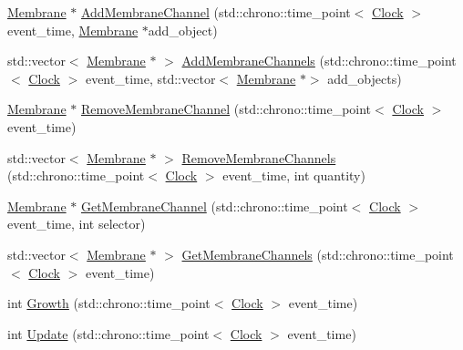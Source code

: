 \begin{DoxyCompactItemize}
\item 
\mbox{\hyperlink{classMembrane}{Membrane}} $\ast$ \mbox{\hyperlink{classMembrane_a3e3b4f55f028541e7513f826d01a689a}{Add\+Membrane\+Channel}} (std\+::chrono\+::time\+\_\+point$<$ \mbox{\hyperlink{universe_8h_a0ef8d951d1ca5ab3cfaf7ab4c7a6fd80}{Clock}} $>$ event\+\_\+time, \mbox{\hyperlink{classMembrane}{Membrane}} $\ast$add\+\_\+object)
\item 
std\+::vector$<$ \mbox{\hyperlink{classMembrane}{Membrane}} $\ast$ $>$ \mbox{\hyperlink{classMembrane_aab591875e3266d6c5af0f7c5f7f21e8f}{Add\+Membrane\+Channels}} (std\+::chrono\+::time\+\_\+point$<$ \mbox{\hyperlink{universe_8h_a0ef8d951d1ca5ab3cfaf7ab4c7a6fd80}{Clock}} $>$ event\+\_\+time, std\+::vector$<$ \mbox{\hyperlink{classMembrane}{Membrane}} $\ast$$>$ add\+\_\+objects)
\item 
\mbox{\hyperlink{classMembrane}{Membrane}} $\ast$ \mbox{\hyperlink{classMembrane_a36d6927c8869cc752b55623dac661107}{Remove\+Membrane\+Channel}} (std\+::chrono\+::time\+\_\+point$<$ \mbox{\hyperlink{universe_8h_a0ef8d951d1ca5ab3cfaf7ab4c7a6fd80}{Clock}} $>$ event\+\_\+time)
\item 
std\+::vector$<$ \mbox{\hyperlink{classMembrane}{Membrane}} $\ast$ $>$ \mbox{\hyperlink{classMembrane_ac33ffd86416112420dc5b0576287c44d}{Remove\+Membrane\+Channels}} (std\+::chrono\+::time\+\_\+point$<$ \mbox{\hyperlink{universe_8h_a0ef8d951d1ca5ab3cfaf7ab4c7a6fd80}{Clock}} $>$ event\+\_\+time, int quantity)
\item 
\mbox{\hyperlink{classMembrane}{Membrane}} $\ast$ \mbox{\hyperlink{classMembrane_a1e2bdb800f0f38254214ea7cbdc06941}{Get\+Membrane\+Channel}} (std\+::chrono\+::time\+\_\+point$<$ \mbox{\hyperlink{universe_8h_a0ef8d951d1ca5ab3cfaf7ab4c7a6fd80}{Clock}} $>$ event\+\_\+time, int selector)
\item 
std\+::vector$<$ \mbox{\hyperlink{classMembrane}{Membrane}} $\ast$ $>$ \mbox{\hyperlink{classMembrane_a7fac2929241b7ff9b8b7f1ec955b2cc5}{Get\+Membrane\+Channels}} (std\+::chrono\+::time\+\_\+point$<$ \mbox{\hyperlink{universe_8h_a0ef8d951d1ca5ab3cfaf7ab4c7a6fd80}{Clock}} $>$ event\+\_\+time)
\item 
int \mbox{\hyperlink{classMembrane_a544742864485b9ac052f3b241ae5c6b4}{Growth}} (std\+::chrono\+::time\+\_\+point$<$ \mbox{\hyperlink{universe_8h_a0ef8d951d1ca5ab3cfaf7ab4c7a6fd80}{Clock}} $>$ event\+\_\+time)
\item 
int \mbox{\hyperlink{classMembrane_a4af9710ea7f0bc6f1b6b6b6462612d51}{Update}} (std\+::chrono\+::time\+\_\+point$<$ \mbox{\hyperlink{universe_8h_a0ef8d951d1ca5ab3cfaf7ab4c7a6fd80}{Clock}} $>$ event\+\_\+time)
\end{DoxyCompactItemize}
